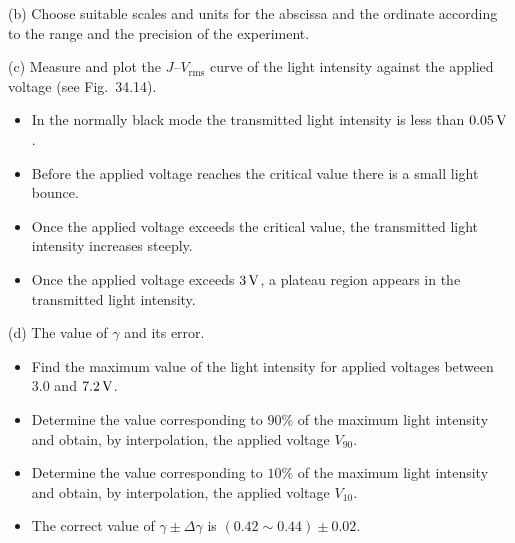 (b) Choose suitable scales and units for the abscissa and the ordinate according to the range
and the precision of the experiment.

(c) Measure and plot the $J$--$V_{\mathrm{rms}}$ curve of the light intensity against the
applied voltage (see Fig.~34.14).

\begin{itemize}
\item In the normally black mode the transmitted light intensity is less than
$0.05\,\mathrm{V}$.
\item Before the applied voltage reaches the critical value there is a small light bounce.
\item Once the applied voltage exceeds the critical value, the transmitted light intensity
increases steeply.
\item Once the applied voltage exceeds $3\,\mathrm{V}$, a plateau region appears in the
transmitted light intensity.
\end{itemize}

(d) The value of $\gamma$ and its error.

\begin{itemize}
\item Find the maximum value of the light intensity for applied voltages between $3.0$ and
$7.2\,\mathrm{V}$.
\item Determine the value corresponding to $90\%$ of the maximum light intensity and obtain,
by interpolation, the applied voltage $V_{90}$.
\item Determine the value corresponding to $10\%$ of the maximum light intensity and obtain,
by interpolation, the applied voltage $V_{10}$.
\item The correct value of $\gamma\pm\Delta\gamma$ is $(0.42\sim0.44)\pm0.02$.
\end{itemize}

